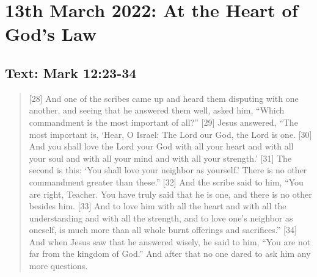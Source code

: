 \section{13th March 2022: At the Heart of God's Law}
\subsection*{Text: Mark 12:23-34}
  \begin{quote}
    [28] And one of the scribes came up and heard them disputing with one
    another, and seeing that he answered them well, asked him, “Which
    commandment is the most important of all?” [29] Jesus answered, “The most
    important is, ‘Hear, O Israel: The Lord our God, the Lord is one.  [30]
    And you shall love the Lord your God with all your heart and with all
    your soul and with all your mind and with all your strength.’ [31] The
    second is this: ‘You shall love your neighbor as yourself.’ There is no
    other commandment greater than these.” [32] And the scribe said to him,
    “You are right, Teacher.  You have truly said that he is one, and there
    is no other besides him.  [33] And to love him with all the heart and
    with all the understanding and with all the strength, and to love one’s
    neighbor as oneself, is much more than all whole burnt offerings and
    sacrifices.” [34] And when Jesus saw that he answered wisely, he said to
    him, “You are not far from the kingdom of God.” And after that no one
    dared to ask him any more questions.
  \end{quote}
